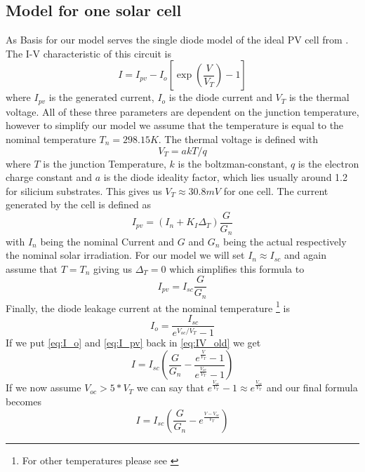 \subsection{Model for one solar cell}
As Basis for our model serves the single diode model of the ideal PV cell from \cite{villa:pvmodel}  . The I-V characteristic of this circuit is
\begin{equation} \label{eq:IV_old}
 I = I_{pv} - I_o \left[ \exp \left( \frac{V}{V_T} \right) - 1 \right]
\end{equation}
where $I_{pv}$ is the generated current, $I_o$ is the diode current and $V_T$ is the thermal voltage. All of these three parameters are dependent on the junction temperature, however to simplify our model we assume that the temperature is equal to the nominal temperature $T_n = 298.15K$. The thermal voltage is defined with
\begin{equation}
V_T = a k T / q
\end{equation}   
where $T$ is the junction Temperature, $k$ is the boltzman-constant, $q$ is the electron charge constant and $a$ is the diode ideality factor, which lies usually around 1.2 for silicium substrates. This gives us $V_T \approx 30.8mV$ for one cell. The current generated by the cell is defined as
\begin{equation} 
 I_{pv} = \left( I_n + K_I \Delta_T \right) \frac{G}{G_n}
\end{equation} 
with $I_n$ being the nominal Current and $G$ and $G_n$ being the actual respectively the nominal solar irradiation. For our model we will set $I_n \approx I_{sc}$ and again assume that $T = T_n$ giving us $\Delta_T = 0$ which simplifies this formula to
\begin{equation} \label{eq:I_pv}
 I_{pv} = I_{sc} \frac{G}{G_n}
\end{equation} 
Finally, the diode leakage current at the nominal temperature \footnote{For other temperatures please see \cite{villa:pvmodel}} is
\begin{equation} \label{eq:I_o}
 I_o = \frac{I_{sc}}{e^{V_{oc} / V_T} - 1}
\end{equation}
 If we put \eqref{eq:I_o} and \eqref{eq:I_pv} back in \eqref{eq:IV_old} we get
\begin{equation}
I = I_{sc} \left( \frac{G}{G_n} - \frac{e^{\frac{V}{V_T}}-1}{e^{\frac{V_{oc}}{V_T}}-1} \right)
\end{equation}
If we now assume $V_{oc} > 5 * V_T$ we can say that $e^{\frac{V_{oc}}{V_T}}-1 \approx e^{\frac{V_{oc}}{V_T}}$ and our final formula becomes
\begin{equation} \label{eq:IV}
I = I_{sc} \left( \frac{G}{G_n} - e^{\frac{V - V_{oc}}{V_T}} \right)
\end{equation}

